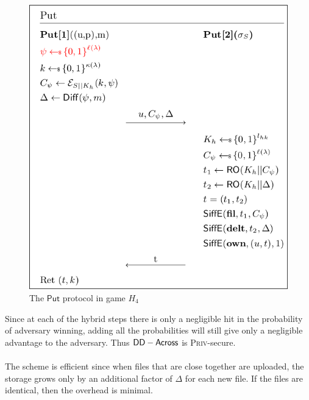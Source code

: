 \begin{figure}[H]
	\centering
	\includegraphics[scale=0.5]{H4}
	\caption{The $\mathsf{Put}$ protocol in game $H_4$}
\end{figure}        

Since at each of the hybrid steps there is only a negligible hit in the probability of adversary winning, adding all the probabilities will still give only a negligible advantage to the adversary. Thus $\mathsf{DD-Across}$ is \textsc{Priv}-secure.\\ \\
The scheme is efficient since when files that are close together are uploaded, the storage grows only by an additional factor of $\Delta$ for each new file. If the files are identical, then the overhead is minimal.